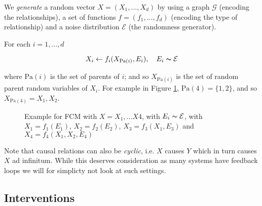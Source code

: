 We \textit{generate} a random vector $X = (X_1, ..., X_d)$ by using a graph $\mathcal{G}$ (encoding the relationships),
a set of functions $f = (f_1, ..., f_d)$ (encoding the type of relationship) and a noise distribution $\mathcal{E}$
(the randomness generator).

For each $i = 1, ..., d$

$$
    X_i \leftarrow f_i(X_{\text{Pa}(i)}, E_i), \quad E_i \thicksim \mathcal{E}
$$

where $\text{Pa}(i)$ is the set of parents of $i$; and so $X_{\text{Pa}(i)}$ is the set of random parent
random variables of $X_i$. For example in Figure \ref{fig:fcm_1}, $\text{Pa}(4) = \{1, 2\}$, 
and so $X_{\text{Pa}(4)} = X_1, X_2$.

\begin{figure}[!h]
    \centering

    \caption{ Example for FCM with $X = X_1, ... X4$, with $E_i \thicksim \mathcal{E}$, 
    with $X_1 = f_1(E_1)$, $X_2 = f_2(E_2)$, $X_3 = f_3(X_1, E_3)$ and 
    $X_4 = f_4(X_1, X_2, E_4)$}
    \label{fig:fcm_1}

\end{figure}


Note that causal relations can also be \textit{cyclic}, i.e. $X$ causes $Y$ which in turn causes 
$X$ ad infinitum. While this deserves consideration as many systems have feedback loops we will
for simplicty not look at such settings.

\subsection{Interventions}

